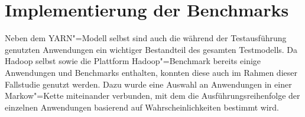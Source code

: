 \chapter{Implementierung der Benchmarks}
\label{chap:benchmarks}

Neben dem YARN"=Modell selbst sind auch die während der Testausführung genutzten Anwendungen ein wichtiger Bestandteil des gesamten Testmodells.
Da Hadoop selbst sowie die Plattform Hadoop"=Benchmark bereits einige Anwendungen und Benchmarks enthalten, konnten diese auch im Rahmen dieser Fallstudie genutzt werden.
Dazu wurde eine Auswahl an Anwendungen in einer Markow"=Kette miteinander verbunden, mit dem die Ausführungsreihenfolge der einzelnen Anwendungen basierend auf Wahrscheinlichkeiten bestimmt wird.





